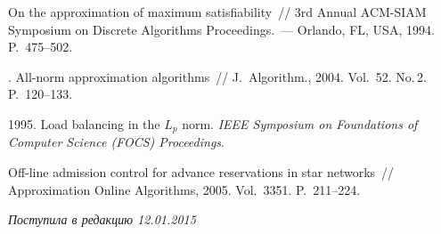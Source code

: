 \begin{multicols}{2}
{{\begin{thebibliography}{99}
{On the approximation of maximum satisfiability}~//
3rd Annual ACM-SIAM Symposium on Discrete Algorithms Proceedings.~---
Orlando, FL, USA,  1994. P.~475--502.

\columnbreak

.
All-norm approximation algorithms~// {J.~Algorithm.}, 2004.
Vol.~52. No.\,2. P.~120--133.

 1995. Load balancing in the $L_p$ norm.
\textit{IEEE Symposium on Foundations of Computer Science
(FOCS) Proceedings}.

Off-line admission control for advance
reservations in star networks~//
{Approximation Online
Algorithms}, 2005. Vol.~3351. P.~211--224.








\end{thebibliography}
} }

\end{multicols}

 \label{end\stat}


\hfill{\small\textit{Поступила в редакцию 12.01.2015}}
\renewcommand{\bibname}{\protect\rm Литература}
\renewcommand{\figurename}{\protect\bf Рис.}
\renewcommand{\tablename}{\protect\bf Таблица}

